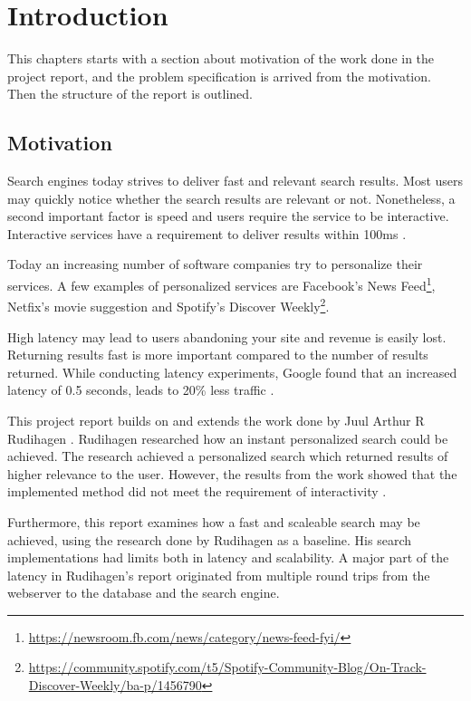 \chapter{Introduction}
\label{ch:introduction}
This chapters starts with a section about motivation of the work done in the project report,
and the problem specification is arrived from the motivation.
Then the structure of the report is outlined.

\section{Motivation}
Search engines today strives to deliver fast and relevant search results.
Most users may quickly notice whether the search results are relevant or not.
Nonetheless, a second important factor is speed and users require the service to be interactive.
Interactive services have a requirement to deliver results within 100ms \cite{google-latency}.

Today an increasing number of software companies try to personalize their services.
A few examples of personalized services are Facebook's News Feed\footnote{\url{https://newsroom.fb.com/news/category/news-feed-fyi/}},
Netfix's movie suggestion \cite{netflix-recommendation} and Spotify's Discover Weekly\footnote{\url{https://community.spotify.com/t5/Spotify-Community-Blog/On-Track-Discover-Weekly/ba-p/1456790}}.

High latency may lead to users abandoning your site and revenue is easily lost.
Returning results fast is more important compared to the number of results returned.
While conducting latency experiments, Google found that an increased latency of 0.5 seconds, leads to 20\% less traffic \cite{google-marissa}.

This project report builds on and extends the work done by Juul Arthur R Rudihagen \cite{master-thesis}.
Rudihagen researched how an instant personalized search could be achieved.
The research achieved a personalized search which returned results of higher relevance to the user.
However, the results from the work showed that the implemented method did not meet the requirement of interactivity \cite{master-thesis}.

Furthermore, this report examines how a fast and scaleable search may be achieved, using the research done by Rudihagen as a baseline.
His search implementations had limits both in latency and scalability.
A major part of the latency in Rudihagen's report originated from multiple round trips from the webserver to the database and the search engine.

